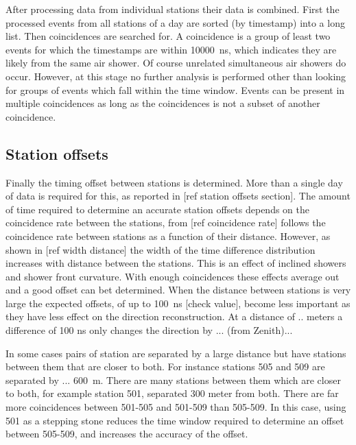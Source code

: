 After processing data from individual stations their data is combined. First the processed events from all stations of a day are sorted (by timestamp) into a long list. Then coincidences are searched for. A coincidence is a group of least two events for which the \gps timestamps are within \SI{10000}{\ns}, which indicates they are likely from the same air shower. Of course unrelated simultaneous air showers do occur. However, at this stage no further analysis is performed other than looking for groups of events which fall within the time window. Events can be present in multiple coincidences as long as the coincidences is not a subset of another coincidence. 


\subsection{Station offsets}

Finally the timing offset between stations is determined. More than a single day of data is required for this, as reported in [ref station offsets section]. The amount of time required to determine an accurate station offsets depends on the coincidence rate between the stations, from [ref coincidence rate] follows the coincidence rate between stations as a function of their distance. However, as shown in [ref width distance] the width of the time difference distribution increases with distance between the stations. This is an effect of inclined showers and shower front curvature. With enough coincidences these effects average out and a good offset can bet determined. When the distance between stations is very large the expected \gps offsets, of up to \SI{100}{\ns} [check value], become less important as they have less effect on the direction reconstruction. At a distance of .. meters a difference of 100 ns only changes the direction by ... (from Zenith)...

In some cases pairs of station are separated by a large distance but have stations between them that are closer to both. For instance stations 505 and 509 are separated by ... \SI{600}{\meter}. There are many stations between them which are closer to both, for example station 501, separated 300 meter from both. There are far more coincidences between 501-505 and 501-509 than 505-509. In this case, using 501 as a stepping stone reduces the time window required to determine an offset between 505-509, and increases the accuracy of the offset.

